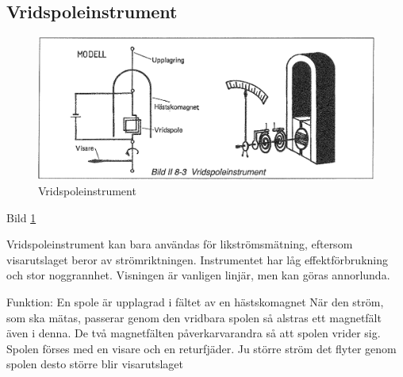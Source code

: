 \subsection{Vridspoleinstrument}

\begin{figure}
  \includegraphics[width=\textwidth]{images/bild_2_8-03}
  \caption{Vridspoleinstrument}
  \label{fig:bildII8-3}
\end{figure}

Bild \ref{fig:bildII8-3}

Vridspoleinstrument kan bara användas för likströmsmätning, eftersom
visarutslaget beror av strömriktningen. Instrumentet har låg
effektförbrukning och stor noggrannhet.  Visningen är vanligen linjär,
men kan göras annorlunda.

Funktion: En spole är upplagrad i fältet av en hästskomagnet När den
ström, som ska mätas, passerar genom den vridbara spolen så alstras
ett magnetfält även i denna. De två magnetfälten påverkarvarandra så
att spolen vrider sig. Spolen förses med en visare och en
returfjäder. Ju större ström det flyter genom spolen desto större blir
visarutslaget

